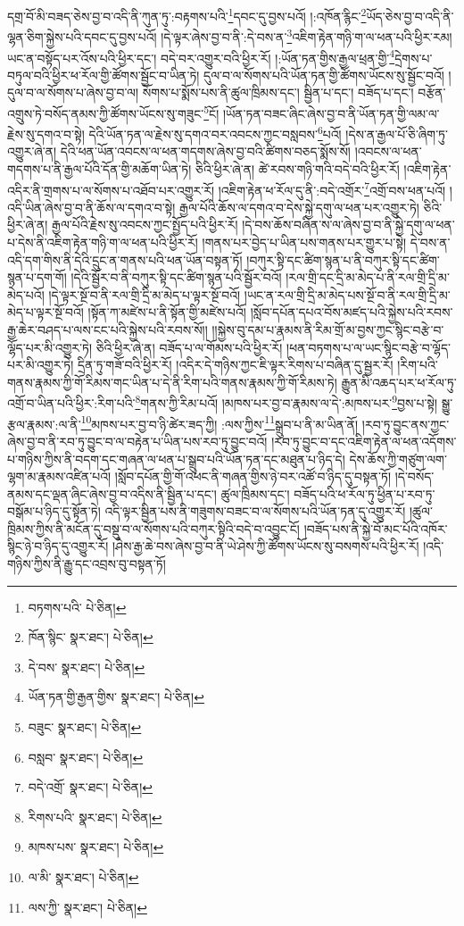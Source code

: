 དགྲ་བོ་མི་བཟད་ཅེས་བྱ་བ་འདི་ནི་ཀུན་ཏུ་:བརྟགས་པའི་\footnote{བཏགས་པའི་  པེ་ཅིན། }དབང་དུ་བྱས་པའོ། །:འཁོན་རྙིང་\footnote{ཁོན་སྙིང་  སྣར་ཐང་།  པེ་ཅིན། }ཡོད་ཅེས་བྱ་བ་འདི་ནི་ལྷན་ཅིག་སྐྱེས་པའི་དབང་དུ་བྱས་པའོ། །དེ་ལྟར་ཞེས་བྱ་བ་ནི་:དེ་བས་ན་\footnote{དེ་བས་  སྣར་ཐང་།  པེ་ཅིན། }འཇིག་རྟེན་གཉི་ག་ལ་ཕན་པའི་ཕྱིར་རམ། ཡང་ན་བསྟོད་པར་འོས་པའི་ཕྱིར་དང་། བདེ་བར་འགྱུར་བའི་ཕྱིར་རོ། །:ཡོན་ཏན་གྱིས་རྒྱལ་ཕྲན་གྱི་\footnote{ཡོན་ཏན་གྱི་རྒྱན་གྱིས་  སྣར་ཐང་།  པེ་ཅིན། }དྲེགས་པ་བཏུལ་བའི་ཕྱིར་ཕ་རོལ་གྱི་ཚོགས་སྦྱོང་བ་ཡིན་ཏེ། དུལ་བ་ལ་སོགས་པའི་ཡོན་ཏན་གྱི་ཚོགས་ཡོངས་སུ་སྦྱོང་བའོ། །དུལ་བ་ལ་སོགས་པ་ཞེས་བྱ་བ་ལ། སོགས་པ་སྨོས་པས་ནི་ཚུལ་ཁྲིམས་དང་། སྦྱིན་པ་དང་། བཟོད་པ་དང་། བརྩོན་འགྲུས་ཏེ་བསོད་ནམས་ཀྱི་ཚོགས་ཡོངས་སུ་གཟུང་\footnote{བཟུང་  སྣར་ཐང་།  པེ་ཅིན། }ངོ། །ཡོན་ཏན་བཟང་ཞིང་ཞེས་བྱ་བ་ནི་ཡོན་ཏན་གྱི་ལམ་ལ་རྗེས་སུ་དགའ་བ་སྟེ། དེའི་ཡོན་ཏན་ལ་རྗེས་སུ་དགའ་བར་འབངས་ཀྱང་བསླབས་\footnote{བསླབ་  སྣར་ཐང་།  པེ་ཅིན། }པའོ། །དེས་ན་རྒྱལ་པོ་ཅི་ཞིག་ཏུ་འགྱུར་ཞེ་ན། དེའི་ཕན་ཡོན་འབངས་ལ་ཕན་གདགས་ཞེས་བྱ་བའི་ཚིགས་བཅད་སྨོས་སོ། །འབངས་ལ་ཕན་གདགས་པ་ནི་རྒྱལ་པོའི་དོན་གྱི་མཆོག་ཡིན་ཏེ། ཅིའི་ཕྱིར་ཞེ་ན། ཚེ་རབས་གཉི་གའི་བདེ་བའི་ཕྱིར་རོ། །འཇིག་རྟེན་འདིར་ནི་གྲགས་པ་ལ་སོགས་པ་འཐོབ་པར་འགྱུར་རོ། །འཇིག་རྟེན་ཕ་རོལ་དུ་ནི་:བདེ་འགྲོར་\footnote{བདེ་འགྲོ་  སྣར་ཐང་།  པེ་ཅིན། }འགྲོ་བས་ཕན་པའོ། །འདི་ཡིན་ཞེས་བྱ་བ་ནི་ཆོས་ལ་དགའ་བ་སྟེ། རྒྱལ་པོའི་ཆོས་ལ་དགའ་བ་དེས་སྐྱེ་དགུ་ལ་ཕན་པར་འགྱུར་ཏེ། ཅིའི་ཕྱིར་ཞེ་ན། རྒྱལ་པོའི་རྗེས་སུ་འབངས་ཀྱང་སྤྱོད་པའི་ཕྱིར་རོ། །དེ་བས་ཆོས་བཞིན་ས་ལ་ཞེས་བྱ་བ་ནི་སྐྱེ་དགུ་ལ་ཕན་པ་དེས་ནི་འཇིག་རྟེན་གཉི་ག་ལ་ཕན་པའི་ཕྱིར་རོ། །གནས་པར་བྱེད་པ་ཡིན་པས་གནས་པར་གྱུར་པ་སྟེ། དེ་བས་ན་འདི་དག་གིས་ནི་དེའི་དྲུང་ན་གནས་པའི་ཕན་ཡོན་བསྟན་ཏོ། །བཀུར་སྟི་དང་ཚིག་སྙན་པ་ནི་བཀུར་སྟི་དང་ཚིག་སྙན་པ་དག་གོ། །དེའི་སྦྱོར་བ་ནི་བཀུར་སྟི་དང་ཚིག་སྙན་པའི་སྦྱོར་བའོ། །རལ་གྲི་དང་དྲི་མ་མེད་པ་ནི་རལ་གྲི་དྲི་མ་མེད་པའོ། །དེ་ལྟར་སྔོ་བ་ནི་རལ་གྲི་དྲི་མ་མེད་པ་ལྟར་སྔོ་བའོ། །ཡང་ན་རལ་གྲི་དྲི་མ་མེད་པས་སྔོ་བ་ནི་རལ་གྲི་དྲི་མ་མེད་པ་ལྟར་སྔོ་བའོ། །སྟོན་ཀ་མཛེས་པ་ནི་སྟོན་གྱི་མཛེས་པའོ། །སློབ་དཔོན་དཔའ་བོས་མཛད་པའི་སྐྱེས་པའི་རབས་རྒྱ་ཆེར་བཤད་པ་ལས་ངང་པའི་སྐྱེས་པའི་རབས་སོ།། །།སྐྱེས་བུ་དམ་པ་རྣམས་ནི་རིམ་གྲོ་མ་བྱས་ཀྱང་སྙིང་བརྩེ་བ་ལྷོད་པར་མི་འགྱུར་ཏེ། ཅིའི་ཕྱིར་ཞེ་ན། བཟོད་པ་ལ་གོམས་པའི་ཕྱིར་རོ། །ཕན་བཏགས་པ་ལ་ཡང་སྙིང་བརྩེ་བ་ལྷོད་པར་མི་འགྱུར་ཏེ། དྲིན་ཏུ་གཟོ་བའི་ཕྱིར་རོ། །འདིར་དེ་གཉིས་ཀྱང་ཇི་ལྟར་རིགས་པ་བཞིན་དུ་སྦྱར་རོ། །རིག་པའི་གནས་རྣམས་ཀྱི་གོ་རིམས་གང་ཡིན་པ་དེ་ནི་རིག་པའི་གནས་རྣམས་ཀྱི་གོ་རིམས་ཏེ། རྒྱུན་མི་འཆད་པར་ཕ་རོལ་ཏུ་འགྲོ་བ་ཡིན་པའི་ཕྱིར་:རིག་པའི་\footnote{རིགས་པའི་  སྣར་ཐང་།  པེ་ཅིན། }གནས་ཀྱི་རིམ་པའོ། །མཁས་པར་བྱ་བ་རྣམས་ལ་དེ་:མཁས་པར་\footnote{མཁས་པས་  སྣར་ཐང་།  པེ་ཅིན། }བྱས་པ་སྟེ། སྒྱུ་རྩལ་རྣམས་:ལ་ནི་\footnote{ལ་མི་  སྣར་ཐང་།  པེ་ཅིན། }མཁས་པར་བྱ་བ་ཉི་ཚེར་ཟད་ཀྱི། :ལས་ཀྱིས་\footnote{ལས་ཀྱི་  སྣར་ཐང་།  པེ་ཅིན། }སྒྲུབ་པ་ནི་མ་ཡིན་ནོ། །རབ་ཏུ་བྱུང་ནས་ཀྱང་ཞེས་བྱ་བ་ནི་རབ་ཏུ་བྱུང་བ་ལ་བརྟེན་པ་ཡིན་པས་རབ་ཏུ་བྱུང་བའོ། །རབ་ཏུ་བྱུང་བ་དང་འཇིག་རྟེན་ལ་ཕན་འདོགས་པ་གཉིས་ཀྱིས་ནི་བདག་དང་གཞན་ལ་ཕན་པ་སྒྲུབ་པའི་ཡོན་ཏན་དང་མཐུན་པ་ཉིད་དེ། དེས་ཆོས་ཀྱི་གཙུག་ལག་ལྷག་མ་རྣམས་འཛིན་པའོ། །སློབ་དཔོན་གྱི་གོ་འཕང་ནི་གཞན་གྱིས་ཉེ་བར་འཚོ་བ་ཉིད་དུ་བསྟན་ཏོ། །དེ་བསོད་ནམས་དང་ལྡན་ཞིང་ཞེས་བྱ་བ་འདིས་ནི་སྦྱིན་པ་དང་། ཚུལ་ཁྲིམས་དང་། བཟོད་པའི་ཕ་རོལ་ཏུ་ཕྱིན་པ་རབ་ཏུ་བསྒོམ་པ་ཉིད་དུ་སྟོན་ཏེ། འདི་ལྟར་སྦྱིན་པས་ནི་གཟུགས་བཟང་བ་ལ་སོགས་པའི་ཡོན་ཏན་དུ་འགྱུར་རོ། །ཚུལ་ཁྲིམས་ཀྱིས་ནི་མངོན་དུ་བསྡུ་བ་ལ་སོགས་པའི་བཀུར་སྟིའི་བདེ་བ་འབྱུང་ངོ། །བཟོད་པས་ནི་སྐྱེ་བོ་མང་པོའི་འཁོར་སྙིང་ཉེ་བ་ཉིད་དུ་འགྱུར་རོ། །ཤེས་རྒྱ་ཆེ་བས་ཞེས་བྱ་བ་ནི་ཡེ་ཤེས་ཀྱི་ཚོགས་ཡོངས་སུ་བསགས་པའི་ཕྱིར་རོ། །འདི་གཉིས་ཀྱིས་ནི་རྒྱུ་དང་འབྲས་བུ་བསྟན་ཏོ། 